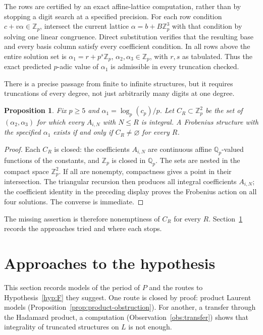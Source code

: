 \documentclass[11pt]{amsart}
\newtheorem{proposition}[theorem]{Proposition}
\theoremstyle{definition}
\theoremstyle{remark}
\newcommand{\Z}{\mathbb{Z}}
\newcommand{\Q}{\mathbb{Q}}
\begin{document}
The rows are certified by an exact affine-lattice computation, rather than
by stopping a digit search at a specified precision. For each row condition
$c+v\alpha\in\Z_p$, intersect the current lattice $\alpha=b+B\Z_p^3$ with that
condition by solving one linear congruence. Direct substitution verifies that the
resulting base and every basis column satisfy every coefficient condition.
In all rows above the entire solution set is
$\alpha_1=r+p^s\Z_p$, $\alpha_2,\alpha_3\in\Z_p$, with $r,s$ as tabulated.
Thus the exact predicted $p$-adic value of $\alpha_1$ is admissible in every
truncation checked.

There is a precise passage from finite to infinite structures, but it requires
truncations of every degree, not just arbitrarily many digits at one degree.
\begin{proposition}\label{prop:compactness}
Fix $p\ge5$ and $\alpha_1=\log_p(c_p)/p$. Let $C_R\subset\Z_p^2$ be the set of
$(\alpha_2,\alpha_3)$ for which every $A_{i,N}$ with $N\le R$ is integral.
A Frobenius structure with the specified $\alpha_1$ exists if and only if
$C_R\ne\varnothing$ for every $R$.
\end{proposition}
\begin{proof}
Each $C_R$ is closed: the coefficients $A_{i,N}$ are continuous affine
$\Q_p$-valued functions of the constants, and $\Z_p$ is closed in $\Q_p$.
The sets are nested in the compact space $\Z_p^2$.
If all are nonempty, compactness gives a point in their intersection.
The triangular recursion then produces all integral coefficients $A_{i,N}$;
the coefficient identity in the preceding display proves the Frobenius action
on all four solutions. The converse is immediate.
\end{proof}

The missing assertion is therefore nonemptiness of $C_R$ for every $R$.
Section~\ref{sec:approaches} records the approaches tried and where each stops.


\section{Approaches to the hypothesis}\label{sec:approaches}

This section records models of the period of $P$ and the routes to
Hypothesis~\ref{hyp:F} they suggest. One route is closed by proof: product Laurent
models (Proposition~\ref{prop:product-obstruction}). For another, a transfer through the Hadamard
product, a computation (Observation~\ref{obs:transfer}) shows that integrality of truncated
structures on $L$ is not enough.
\end{document}
